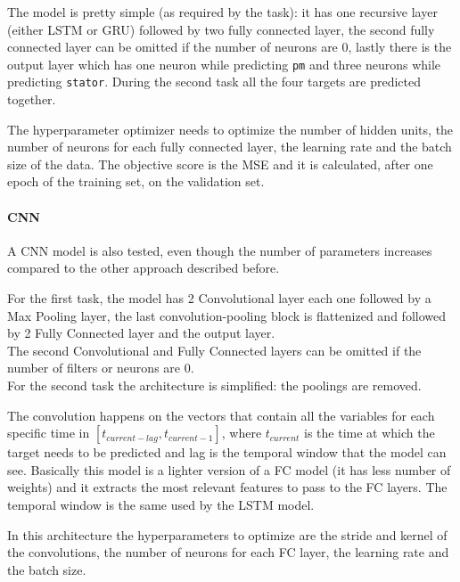 The model is pretty simple (as required by the task): it has one recursive layer (either LSTM or GRU) followed by two fully connected layer, the second fully connected layer can be omitted if the number of neurons are 0, lastly there is the output layer which has one neuron while predicting \verb|pm| and three neurons while predicting \verb|stator|.
During the second task all the four targets are predicted together.

The hyperparameter optimizer needs to optimize the number of hidden units, the number of neurons for each fully connected layer, the learning rate and the batch size of the data.
The objective score is the MSE and it is calculated, after one epoch of the training set, on the validation set.

\paragraph{CNN}
A CNN model is also tested, even though the number of parameters increases compared to the other approach described before.

For the first task, the model has 2 Convolutional layer each one followed by a Max Pooling layer, the last convolution-pooling block is flattenized and followed by 2 Fully Connected layer and the output layer.\\
The second Convolutional and Fully Connected layers can be omitted if the number of filters or neurons are 0.\\
For the second task the architecture is simplified: the poolings are removed.
 
The convolution happens on the vectors that contain all the variables for each specific time in $[t_{current-lag},t_{current-1}]$, where $t_{current}$ is the time at which the target needs to be predicted and lag is the temporal window that the model can see.
Basically this model is a lighter version of a FC model (it has less number of weights) and it extracts the most relevant features to pass to the FC layers.
The temporal window is the same used by the LSTM model.

In this architecture the hyperparameters to optimize are the stride and kernel of the convolutions, the number of neurons for each FC layer, the learning rate and the batch size.

